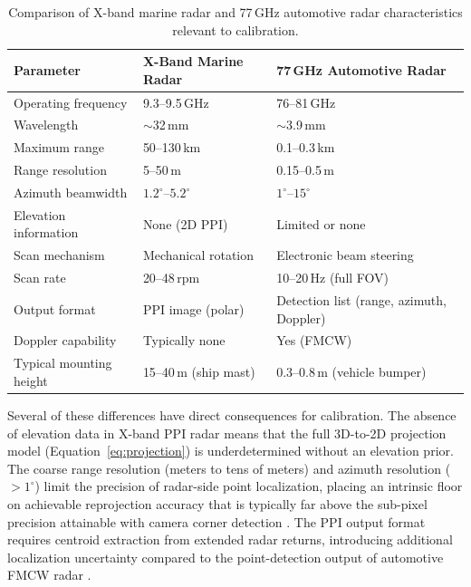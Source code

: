 \begin{table}[htbp]
  \centering
  \caption{Comparison of X-band marine radar and 77\,GHz automotive radar characteristics relevant to calibration.}
  \label{tab:radar_camera_comparison}
  \begin{tabular}{@{}lll@{}}
    \toprule
    \textbf{Parameter} & \textbf{X-Band Marine Radar} & \textbf{77\,GHz Automotive Radar} \\
    \midrule
    Operating frequency      & 9.3--9.5\,GHz                 & 76--81\,GHz \\
    Wavelength               & $\sim$32\,mm                   & $\sim$3.9\,mm \\
    Maximum range            & 50--130\,km                    & 0.1--0.3\,km \\
    Range resolution         & 5--50\,m                       & 0.15--0.5\,m \\
    Azimuth beamwidth        & $1.2^{\circ}$--$5.2^{\circ}$  & $1^{\circ}$--$15^{\circ}$ \\
    Elevation information    & None (2D PPI)                  & Limited or none \\
    Scan mechanism           & Mechanical rotation            & Electronic beam steering \\
    Scan rate                & 20--48\,rpm                    & 10--20\,Hz (full FOV) \\
    Output format            & PPI image (polar)              & Detection list (range, azimuth, Doppler) \\
    Doppler capability       & Typically none                 & Yes (FMCW) \\
    Typical mounting height  & 15--40\,m (ship mast)          & 0.3--0.8\,m (vehicle bumper) \\
    \bottomrule
  \end{tabular}
\end{table}

Several of these differences have direct consequences for calibration. The absence of elevation data in X-band PPI radar means that the full 3D-to-2D projection model (Equation~\eqref{eq:projection}) is underdetermined without an elevation prior. The coarse range resolution (meters to tens of meters) and azimuth resolution ($>1^{\circ}$) limit the precision of radar-side point localization, placing an intrinsic floor on achievable reprojection accuracy that is typically far above the sub-pixel precision attainable with camera corner detection \cite{Skolnik2008, Richards2022}. The PPI output format requires centroid extraction from extended radar returns, introducing additional localization uncertainty compared to the point-detection output of automotive FMCW radar \cite{patole20174d}.

